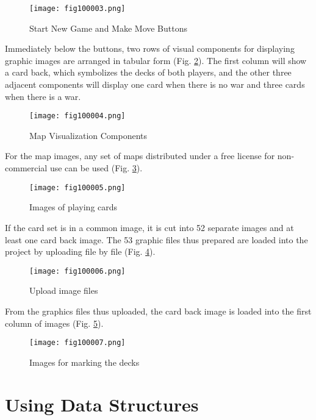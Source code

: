 \begin{figure}[H]
   \centering
   \texttt{[image: fig100003.png]}
   \caption{Start New Game and Make Move Buttons}
\label{fig100003}
\end{figure}

Immediately below the buttons, two rows of visual components for displaying graphic images are arranged in tabular form (Fig. \ref{fig100004}). The first column will show a card back, which symbolizes the decks of both players, and the other three adjacent components will display one card when there is no war and three cards when there is a war.

\begin{figure}[H]
   \centering
   \texttt{[image: fig100004.png]}
   \caption{Map Visualization Components}
\label{fig100004}
\end{figure}

For the map images, any set of maps distributed under a free license for non-commercial use can be used (Fig. \ref{fig100005}).

\begin{figure}[H]
   \centering
   \texttt{[image: fig100005.png]}
   \caption{Images of playing cards}
\label{fig100005}
\end{figure}

If the card set is in a common image, it is cut into 52 separate images and at least one card back image. The 53 graphic files thus prepared are loaded into the project by uploading file by file (Fig. \ref{fig100006}).

\begin{figure}[H]
   \centering
   \texttt{[image: fig100006.png]}
   \caption{Upload image files}
\label{fig100006}
\end{figure}

From the graphics files thus uploaded, the card back image is loaded into the first column of images (Fig. \ref{fig100007}).

\begin{figure}[H]
   \centering
   \texttt{[image: fig100007.png]}
   \caption{Images for marking the decks}
\label{fig100007}
\end{figure}

\section{Using Data Structures}


